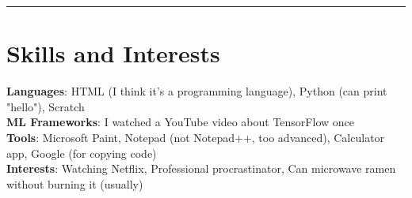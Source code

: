 \documentclass[11pt]{article}
\begin{document}
\noindent\rule{\textwidth}{0.5pt}

\section*{\textcolor{modernblue}{\Large Skills and Interests}}
\textbf{Languages}: HTML (I think it's a programming language), Python (can print "hello"), Scratch\\
\textbf{ML Frameworks}: I watched a YouTube video about TensorFlow once\\
\textbf{Tools}: Microsoft Paint, Notepad (not Notepad++, too advanced), Calculator app, Google (for copying code)\\
\textbf{Interests}: Watching Netflix, Professional procrastinator, Can microwave ramen without burning it (usually)
\end{document}
